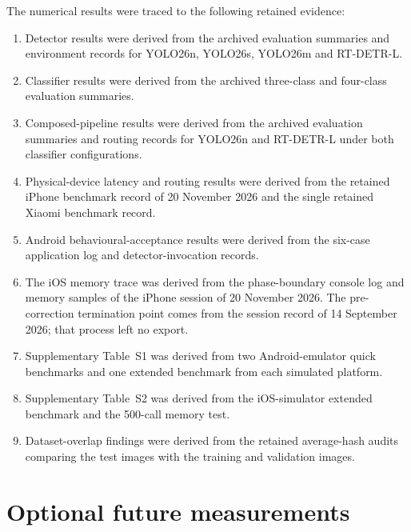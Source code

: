 \documentclass[preprint,12pt,authoryear]{elsarticle}
\begin{document}
The numerical results were traced to the following retained evidence:

\begin{enumerate}
  \item Detector results were derived from the archived evaluation summaries
  and environment records for YOLO26n, YOLO26s, YOLO26m and RT-DETR-L.

  \item Classifier results were derived from the archived three-class and
  four-class evaluation summaries.

  \item Composed-pipeline results were derived from the archived evaluation
  summaries and routing records for YOLO26n and RT-DETR-L under both
  classifier configurations.

  \item Physical-device latency and routing results were derived from the
  retained iPhone benchmark record of 20 November 2026 and the single
  retained Xiaomi benchmark record.

  \item Android behavioural-acceptance results were derived from the
  six-case application log and detector-invocation records.

  \item The iOS memory trace was derived from the phase-boundary console log
  and memory samples of the iPhone session of 20 November 2026. The
  pre-correction termination point comes from the session record of
  14 September 2026; that process left no export.

  \item Supplementary Table~S1 was derived from two Android-emulator quick
  benchmarks and one extended benchmark from each simulated platform.

  \item Supplementary Table~S2 was derived from the iOS-simulator extended
  benchmark and the 500-call memory test.

  \item Dataset-overlap findings were derived from the retained average-hash
  audits comparing the test images with the training and validation images.
\end{enumerate}

\section{Optional future measurements}
\label{sup:future}
\end{document}

